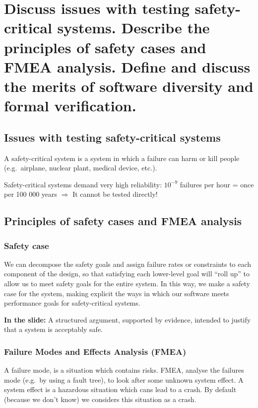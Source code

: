 \clearpage{}
\section{Discuss issues with testing safety-critical systems. Describe the
principles of safety cases and FMEA analysis. Define and discuss the merits
of software diversity and formal verification.}


\subsection{Issues with testing safety-critical systems}
A safety-critical system is a system in which a failure can harm or kill people (e.g.\ airplane, nuclear plant, medical device, etc.). \newline

Safety-critical systems demand very high reliability:
${10}^{-9}$ failures per hour = once per 100 000 years \newline
$\Rightarrow$ It cannot be tested directly!

\subsection{Principles of safety cases and FMEA analysis}

\subsubsection{Safety case}
We can decompose the safety goals and assign failure rates or constraints to each
component of the design, so that satisfying each lower-level goal will “roll up” to allow us to meet safety goals for the entire system. In this way, we make a safety case for the system, making explicit the ways in which our software meets performance goals for safety-critical systems. \newline

\textbf{In the slide:} A structured argument, supported by evidence, intended to justify that a system is 
acceptably safe. \newline

\subsubsection{Failure Modes and Effects Analysis (FMEA)}

A failure mode, is a situation which contains risks.
FMEA, analyse the failures mode (e.g.\ by using a fault tree), to look after some
unknown system effect. A system effect is a hazardous situation which cans lead to a crash. By default (because we don’t know) we considers this situation as a crash. \newline

